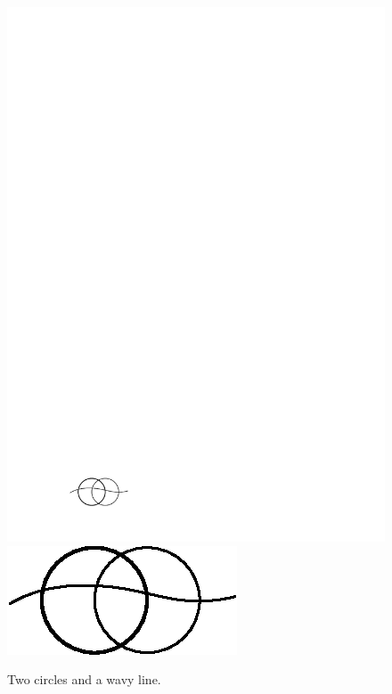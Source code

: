\begin{figure}[htb]
  \centering
  \ifpdf
    \includegraphics{graphics/mygraphic1.pdf}
  \else
    \includegraphics{graphics/mygraphic1-for-ps.eps}
  \fi
  \caption{Two circles and a wavy line.}
\end{figure}

